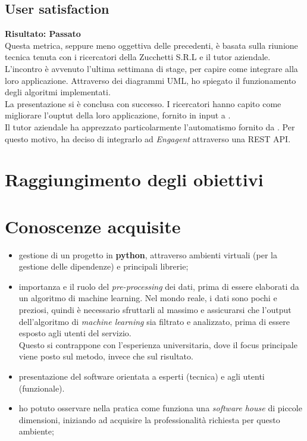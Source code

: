 \subsection{User satisfaction} %
\textbf{Risultato: Passato}\\
Questa metrica, seppure meno oggettiva delle precedenti, è basata sulla riunione tecnica tenuta con i ricercatori della Zucchetti S.R.L e il tutor aziendale.\\
L'incontro è avvenuto l'ultima settimana di stage, per capire come integrare {\app} alla loro applicazione. Attraverso dei diagrammi UML, ho spiegato il funzionamento degli algoritmi implementati.\\
La presentazione si è conclusa con successo. I ricercatori hanno capito come migliorare l'ouptut della loro applicazione, fornito in input a {\app}.\\
Il tutor aziendale ha apprezzato particolarmente l'automatismo fornito da {\app}. Per questo motivo, ha deciso di integrarlo ad \textit{Engagent} attraverso una REST API.

\section{Raggiungimento degli obiettivi}

\section{Conoscenze acquisite}
\begin{itemize}
    \item gestione di un progetto in \textbf{python}, attraverso ambienti virtuali (per la gestione delle dipendenze) e principali librerie;
    \item importanza e il ruolo del \textit{pre-processing} dei dati, prima di essere elaborati da un algoritmo di machine learning. Nel mondo reale, i dati sono pochi e preziosi, quindi è necessario sfruttarli al massimo e assicurarsi che l'output dell'algoritmo di \textit{machine learning} sia filtrato e analizzato, prima di essere esposto agli utenti del servizio.\\ Questo si contrappone con l'esperienza universitaria, dove il focus principale viene posto sul metodo, invece che sul risultato.
    \item presentazione del software orientata a esperti (tecnica) e agli utenti (funzionale).
    \item ho potuto osservare nella pratica come funziona una \textit{software house} di piccole dimensioni, iniziando ad acquisire la professionalità richiesta per questo ambiente;
\end{itemize}
